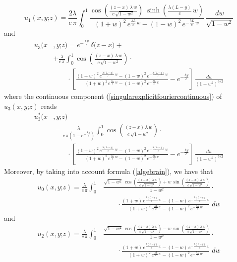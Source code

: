 \documentclass{article}
\renewcommand{\sinh}{\operatorname{sinh}}
\begin{document}
\begin{equation}u_1(x,y\mathord{;}z)=\frac{2\lambda}{c\,\pi}\int_0^1\frac{\cos\left(\frac{(z-x)\,\lambda\,w}{c\,\sqrt{1-w^2}}\right)\;\sinh\left(\frac{\lambda (L-y)}{c}\,w\right)}{(1+w)^2\,e^{\frac{\lambda L}{c}\,w}-(1-w)^2\,e^{-\frac{\lambda L}{c}\,w}}\,\frac{dw}{\sqrt{1-w^2}}\label{inegrep}\end{equation}
and
\begin{align}
u_3(x&,y\mathord{;}z)=e^{-\frac{\lambda\,y}{c}}\,\delta\big(z-x\big)+\nonumber\\
&+\frac{\lambda}{c\,\pi}\int_0^1\cos\left(\frac{(z-x)\,\lambda\,w}{c\,\sqrt{1-w^2}}\right)\cdot\nonumber\\
&\qquad\cdot\left[\frac{(1+w)^2\,e^{\frac{\lambda (L-y)}{c}\,w}-(1-w)^2\,e^{-\frac{\lambda (L-y)}{c}\,w}}{(1+w)^2\,e^{\frac{\lambda L}{c}\,w}-(1-w)^2\,e^{-\frac{\lambda L}{c}\,w}}-e^{-\frac{\lambda y}{c}}\right]\,\frac{dw}{(1-w^2)^{3/2}}\nonumber
\end{align}
where the continuous component (\ref{singularexplicitfouriercontinuous}) of $u_3(x,y\mathord{;}z)$ reads
\begin{align}
u^*_3(x&,y\mathord{;}z)\nonumber\\
&=\frac{\lambda}{c\,\pi\left(1-e^{-\frac{\lambda\,y}{c}}\right)}\int_0^1\cos\left(\frac{(z-x)\,\lambda\,w}{c\,\sqrt{1-w^2}}\right)\cdot\nonumber\\
&\qquad\cdot\left[\frac{(1+w)^2\,e^{\frac{\lambda (L-y)}{c}\,w}-(1-w)^2\,e^{-\frac{\lambda (L-y)}{c}\,w}}{(1+w)^2\,e^{\frac{\lambda L}{c}\,w}-(1-w)^2\,e^{-\frac{\lambda L}{c}\,w}}-e^{-\frac{\lambda y}{c}}\right]\,\frac{dw}{(1-w^2)^{3/2}}\nonumber
\end{align}
Moreover, by taking into account formula (\ref{algebrain}), we have that
\begin{align}
u_0(x,y\mathord{;}z)=\frac{\lambda}{c\,\pi}\int_0^1&\frac{\sqrt{1-w^2}\,\cos\left(\frac{(z-x)\,\lambda\,w}{c\,\sqrt{1-w^2}}\right)+w\,\sin\left(\frac{(z-x)\,\lambda\,w}{c\,\sqrt{1-w^2}}\right)}{1-w^2}\cdot\nonumber\\
&\qquad\cdot\frac{(1+w)\,e^{\frac{\lambda (L-y)}{c}\,w}-(1-w)\,e^{-\frac{\lambda (L-y)}{c}\,w}}{(1+w)^2\,e^{\frac{\lambda L}{c}\,w}-(1-w)^2\,e^{-\frac{\lambda L}{c}\,w}}\;dw\nonumber
\end{align}
and
\begin{align}
u_2(x,y\mathord{;}z)=\frac{\lambda}{c\,\pi}\int_0^1&\frac{\sqrt{1-w^2}\,\cos\left(\frac{(z-x)\,\lambda\,w}{c\,\sqrt{1-w^2}}\right)-w\,\sin\left(\frac{(z-x)\,\lambda\,w}{c\,\sqrt{1-w^2}}\right)}{1-w^2}\cdot\nonumber\\
&\qquad\cdot\frac{(1+w)\,e^{\frac{\lambda (L-y)}{c}\,w}-(1-w)\,e^{-\frac{\lambda (L-y)}{c}\,w}}{(1+w)^2\,e^{\frac{\lambda L}{c}\,w}-(1-w)^2\,e^{-\frac{\lambda L}{c}\,w}}\;dw\nonumber
\end{align}
\end{document}
